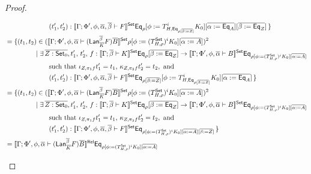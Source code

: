 \documentclass[acmsmall,review,anonymous]{acmart}
\theoremstyle{definition}
\newcommand{\set}{\mathsf{Set}}
\begin{document}
\begin{proof}
\begin{itemize}
\begin{itemize}
{\begin{align*}
  &\hspace*{0.9in}(t_1',t_2') : \oCPOsem{\Gamma;\Phi',
    \phi,\ol\alpha,\ol\beta \vdash F} \Eq_\rho [\phi :=
    T^i_{H,\Eq_{\rho[\ol{\beta:=Z}]}} K_0][\overline{\alpha :=
      \Eq_A}][\ol{\beta :=\Eq_Z}]\,\}\\ 
%
  &= \{(t_1,t_2) \in (\oCPOsem{\Gamma;\Phi',\phi,\ol\alpha
    \vdash (\Lan_{\ol K}^{\ol \beta} F)\ol{B}} \rho [\phi := 
    (T^\set_{H,{\rho}})^i K_0] [\overline{\alpha := A}])^2\\
  & \hspace*{0.63in}|~\exists\, \ol{Z : \oCPO_0}, t_1',\, t_2',\,
  f : \oCPOsem{\Gamma;\ol\beta \vdash K} \Eq_\rho[\overline{\beta :=
      \Eq_Z}]\to \oCPOsem{\Gamma;\Phi',
    \phi,\ol\alpha \vdash B} \Eq_{\rho[\phi := (T^\set_{H,{\rho}})^i K_0]
  [\overline{\alpha := A}]}\\
  &\hspace{0.9in}\mbox{such that } \iota_{Z,\pi_1 f}t_1' = t_1,\,
  \kappa_{Z,\pi_2 f}t_2' = t_2, \mbox{ and }\\
  &\hspace*{0.9in}(t_1',t_2') : \oCPOsem{\Gamma;\Phi',
    \phi,\ol\alpha,\ol\beta \vdash F} \Eq_{\rho[\ol{\beta := Z}]}[\phi :=
      T^i_{H,\Eq_{\rho[\ol{\beta := Z}]}} K_0][\overline{\alpha :=
      \Eq_A}]\,\}\\
    &= \{(t_1,t_2) \in (\oCPOsem{\Gamma;\Phi',\phi,\ol\alpha
    \vdash (\Lan_{\ol K}^{\ol \beta} F)\ol{B}} \rho [\phi := 
    (T^\set_{H,{\rho}})^i K_0] [\overline{\alpha := A}])^2\\
  & \hspace*{0.63in}|~\exists\, \ol{Z : \oCPO_0}, t_1',\, t_2',\,
  f : \oCPOsem{\Gamma;\ol\beta \vdash K} \Eq_\rho[\overline{\beta :=
      \Eq_Z}]\to \oCPOsem{\Gamma;\Phi',
    \phi,\ol\alpha \vdash B} \Eq_{\rho[\phi := (T^\set_{H,{\rho}})^i K_0]
  [\overline{\alpha := A}]}\\
  &\hspace{0.9in}\mbox{such that } \iota_{Z,\pi_1 f}t_1' = t_1,\,
  \kappa_{Z,\pi_2 f}t_2' = t_2, \mbox{ and }\\
  &\hspace*{0.9in}(t_1',t_2') : \oCPOsem{\Gamma;\Phi',
    \phi,\ol\alpha,\ol\beta \vdash F} \Eq_{\rho[\phi :=
      (T^\set_{H,{\rho}})^i K_0][\overline{\alpha := A}][\ol{\beta :=Z}]}\,\}\\
%
  &=\oCPORsem{\Gamma;\Phi',\phi,\ol\alpha
    \vdash (\Lan_{\ol K}^{\ol \beta} F)\ol{B}}  \Eq_{\rho[\phi :=
   (T^\oCPO_{H,\rho})^i K_0] [\overline{\alpha := A}]}\\

\end{align*}}
\end{itemize}
\end{itemize}
\end{proof}
\end{document}
